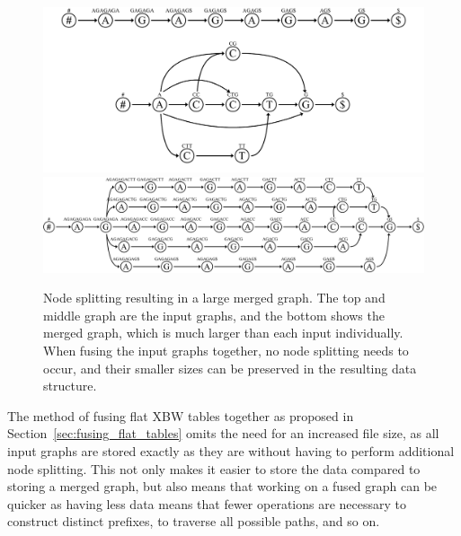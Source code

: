 \documentclass[a4paper,12pt,twoside,BCOR=10mm]{scrbook}
\begin{document}
\begin{figure}[!htb]
\centering
\includegraphics[width=\textwidth]{evo_fig_massive_split.pdf}
\includegraphics[width=\textwidth]{evo_fig_massive_split_3.pdf}
\caption[Node splitting resulting in large merged graph]{Node splitting resulting in a large merged graph. The top and middle graph are the input graphs, and the bottom shows the merged graph, which is much larger than each input individually. When fusing the input graphs together, no node splitting needs to occur, and their smaller sizes can be preserved in the resulting data structure.} \label{fig:evo_fig_massive_split}
\end{figure}

The method of fusing flat XBW tables together as proposed in Section~\ref{sec:fusing_flat_tables} omits
the need for an increased file size,
as all input graphs are stored exactly as they are without having to perform additional node splitting.
This not only makes it easier to store the data compared to storing a merged graph,
but also means that working on
a fused graph can be quicker as having less data means that fewer operations are necessary to construct
distinct prefixes, to traverse all possible paths, and so on.
\end{document}

